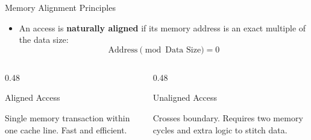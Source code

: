 \documentclass[aspectratio=169,11pt,t]{beamer}
\newcommand{\key}[1]{\textbf{#1}}
\begin{document}
\begin{frame}{Memory Alignment Principles}
\large
\begin{itemize}\setlength{\itemsep}{6pt}
  \item An access is \key{naturally aligned} if its memory address is an exact multiple of the data size:
  $$\text{Address} \pmod{\text{Data Size}} = 0$$
\end{itemize}

\vspace{0.2cm}
\begin{columns}[T,onlytextwidth]
\begin{column}{0.48\textwidth}
\begin{block}{Aligned Access}
\centering
\vspace{0.1cm}
\vspace{0.1cm}
Single memory transaction within one cache line. Fast and efficient.
\end{block}
\end{column}

\begin{column}{0.48\textwidth}
\begin{block}{Unaligned Access}
\centering
\vspace{0.1cm}
\vspace{0.1cm}
Crosses boundary. Requires two memory cycles and extra logic to stitch data.
\end{block}
\end{column}
\end{columns}
\end{frame}

\end{document}
